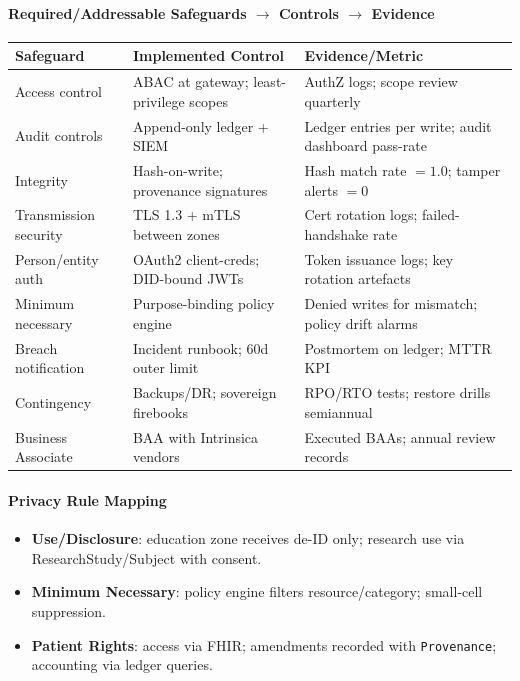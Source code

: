 \documentclass[11pt]{article}
\theoremstyle{plain}
\begin{document}
\paragraph{Required/Addressable Safeguards $\rightarrow$ Controls $\rightarrow$ Evidence}
\begin{center}
\begin{tabular}{l l l}
\hline
Safeguard & Implemented Control & Evidence/Metric \\
\hline
Access control & ABAC at gateway; least-privilege scopes & AuthZ logs; scope review quarterly \\
Audit controls & Append-only ledger + SIEM & Ledger entries per write; audit dashboard pass-rate \\
Integrity & Hash-on-write; provenance signatures & Hash match rate $=1.0$; tamper alerts $=0$ \\
Transmission security & TLS 1.3 + mTLS between zones & Cert rotation logs; failed-handshake rate \\
Person/entity auth & OAuth2 client-creds; DID-bound JWTs & Token issuance logs; key rotation artefacts \\
Minimum necessary & Purpose-binding policy engine & Denied writes for mismatch; policy drift alarms \\
Breach notification & Incident runbook; 60d outer limit & Postmortem on ledger; MTTR KPI \\
Contingency & Backups/DR; sovereign firebooks & RPO/RTO tests; restore drills semiannual \\
Business Associate & BAA with Intrinsica vendors & Executed BAAs; annual review records \\
\hline
\end{tabular}
\end{center}

\paragraph{Privacy Rule Mapping}
\begin{itemize}
  \item \textbf{Use/Disclosure}: education zone receives de-ID only; research use via ResearchStudy/Subject with consent.
  \item \textbf{Minimum Necessary}: policy engine filters resource/category; small-cell suppression.
  \item \textbf{Patient Rights}: access via FHIR; amendments recorded with \texttt{Provenance}; accounting via ledger queries.
\end{itemize}
\end{document}
